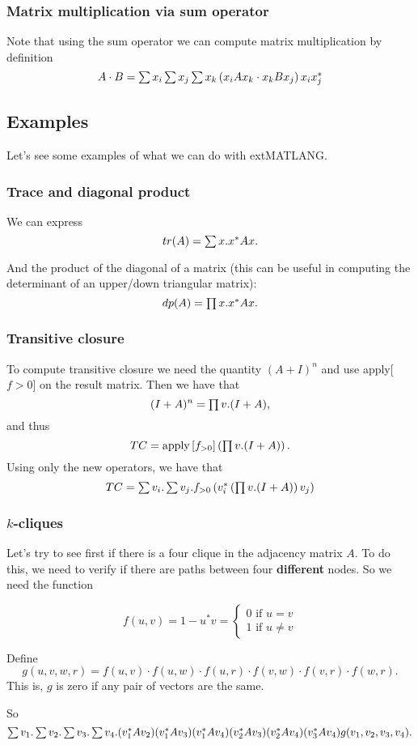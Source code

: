 \subsubsection{Matrix multiplication via sum operator}

Note that using the sum operator we can compute matrix multiplication by definition $$A\cdot B = \textstyle\sum x_i\textstyle\sum x_j\textstyle\sum x_k \left( x_iAx_k\cdot x_kBx_j\right)x_ix_j^*$$

\subsection{Examples}

Let's see some examples of what we can do with extMATLANG.

\subsubsection{Trace and diagonal product}

We can express $$tr(A)=\textstyle\sum x. x^*Ax.$$

And the product of the diagonal of a matrix (this can be useful in computing the determinant of an upper/down triangular matrix): $$dp(A)=\textstyle\prod x. x^*Ax.$$

\subsubsection{Transitive closure}

To compute transitive closure we need the quantity $(A+I)^n$ and use apply[$f>0$] on the result matrix. Then we have that $$(I+A)^n=\textstyle\prod v. (I+A),$$ and thus $$TC = \text{apply}\left[ f_{>0}\right]\left( \textstyle\prod v. (I+A) \right).$$
Using only the new operators, we have that $$TC=\textstyle\sum v_i. \textstyle\sum v_j. f_{>0}\left(v_i^*\left(\textstyle\prod v. (I+A)\right)v_j\right)$$

\subsubsection{$k$-cliques}

Let's try to see first if there is a four clique in the adjacency matrix $A$. To do this, we need to verify if there are paths between four \textbf{different} nodes. So we need the function 

\[
  			f(u,v)=1-u^*v=\begin{cases}
               0 \text{ if } u=v \\
               1 \text{ if } u\neq v
            \end{cases}
		\]

Define $$g(u,v,w,r)=f(u,v)\cdot f(u,w)\cdot f(u,r)\cdot f(v,w)\cdot f(v,r)\cdot f(w,r).$$ This is, $g$ is zero if any pair of vectors are the same.
		
So $$\textstyle\sum v_1.\textstyle\sum v_2. \textstyle\sum v_3. \textstyle\sum v_4. (v_1^*Av_2)(v_1^*Av_3)(v_1^*Av_4)(v_2^*Av_3)(v_2^*Av_4)(v_3^*Av_4)g(v_1,v_2,v_3,v_4).$$

\label{sec:extmatlang}